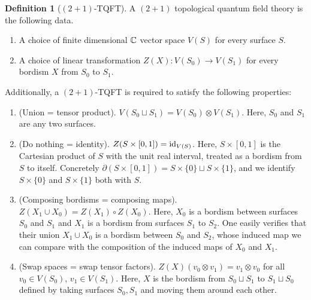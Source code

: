\documentclass{article}
\theoremstyle{definition}
\newtheorem*{definition}{Definition}
\numberwithin{figure}{section}
\begin{document}
\begin{definition}[$(2+1)$-TQFT] A $(2+1)$ topological quantum field theory is the following data.
\begin{enumerate}
\item A choice of finite dimensional $\mathbb{C}$ vector space $V(S)$ for every surface $S$.
\item A choice of linear transformation $Z(X): V(S_0)\xrightarrow{} V(S_1)$ for every bordism $X$ from $S_0$ to $S_1$.
\end{enumerate}
Additionally, a $(2+1)$-TQFT is required to satisfy the following properties:
\begin{enumerate}

\item (Union = tensor product). $V(S_0\sqcup S_1)=V(S_0)\otimes V(S_1)$. Here, $S_0$ and $S_1$ are any two surfaces.

\item (Do nothing = identity). $Z(S\times [0,1])=\mathrm{id}_{V(S)}$. Here, $S\times [0,1]$ is the Cartesian product of $S$ with the unit real interval, treated as a bordism from $S$ to itself. Concretely $\partial (S\times [0,1])=S\times\{0\}\sqcup S\times\{1\}$, and we identify $S\times \{0\}$ and $S\times\{1\}$ both with $S$.

\item (Composing bordisms = composing maps). $Z(X_1\cup X_0)=Z(X_1)\circ Z(X_0)$. Here, $X_0$ is a bordism between surfaces $S_0$ and $S_1$ and $X_1$ is a bordism from surfaces $S_1$ to $S_2$. One easily verifies that their union $X_1\cup X_0$ is a bordism between $S_0$ and $S_2$, whose induced map we can compare with the composition of the induced maps of $X_0$ and $X_1$.

\item (Swap spaces = swap tensor factors). $Z(X)(v_0\otimes v_1)=v_1\otimes v_0$ for all $v_0\in V(S_0)$, $v_1\in V(S_1)$. Here, $X$ is the bordism from $S_0\sqcup S_1$ to $S_1\sqcup S_0$ defined by taking surfaces $S_0,S_1$ and moving them around each other. 
\end{enumerate}

\raggedleft\qedsymbol{}

\end{definition}
\end{document}
